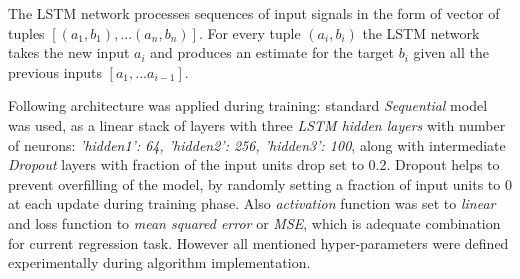 The LSTM network processes sequences of input signals in the form of vector of tuples $[(a_1, b_1), ...(a_n, b_n)]$. For every tuple $(a_i, b_i)$ the LSTM network takes the new input $a_i$ and produces an estimate for the target $b_i$ given all the previous inputs $[a_1, ... a_{i-1}]$.

Following architecture was applied during training: standard \textit{Sequential} model was used, as a linear stack of layers with three \textit{LSTM hidden layers} with number of neurons: \textit{'hidden1': 64, 'hidden2': 256, 'hidden3': 100}, along with intermediate \textit{Dropout} layers with fraction of the input units drop set to 0.2. Dropout helps to prevent overfilling of the model, by randomly setting a fraction of input units to 0 at each update during training phase. Also \textit{activation} function was set to \textit{linear} and loss function to \textit{mean squared error} or \textit{MSE}, which is adequate combination for current regression task. However all mentioned hyper-parameters were defined experimentally during algorithm implementation.

